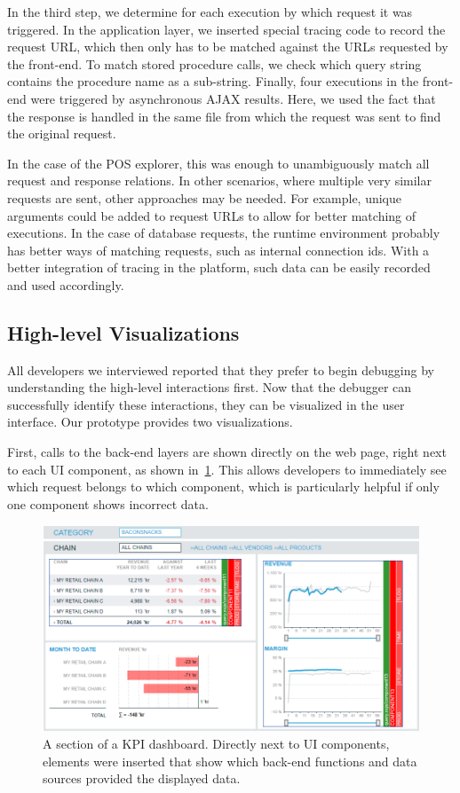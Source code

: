 In the third step, we determine for each execution by which request it was triggered.
In the application layer, we inserted special tracing code to record the request URL, which then only has to be matched against the URLs requested by the front-end.
To match stored procedure calls, we check which query string contains the procedure name as a sub-string.
Finally, four executions in the front-end were triggered by asynchronous AJAX results.
Here, we used the fact that the response is handled in the same file from which the request was sent to find the original request.

In the case of the POS explorer, this was enough to unambiguously match all request and response relations.
In other scenarios, where multiple very similar requests are sent, other approaches may be needed.
For example, unique arguments could be added to request URLs to allow for better matching of executions.
In the case of database requests, the runtime environment probably has better ways of matching requests, such as internal connection ids.
With a better integration of tracing in the platform, such data can be easily recorded and used accordingly.

\subsection{High-level Visualizations}


All developers we interviewed reported that they prefer to begin debugging by understanding the high-level interactions first.
Now that the debugger can successfully identify these interactions, they can be visualized in the user interface.
Our prototype provides two visualizations.

First, calls to the back-end layers are shown directly on the web page, right next to each UI component, as shown in~\cref{fig:pos}.
This allows developers to immediately see which request belongs to which component, which is particularly helpful if only one component shows incorrect data.

\begin{figure}
	\centering
		\includegraphics[width=1.00\linewidth]{img/pos.png}
	\caption{A section of a KPI dashboard. Directly next to UI components, elements were inserted that show which back-end functions and data sources provided the displayed data.}
	\label{fig:pos}
\end{figure}

